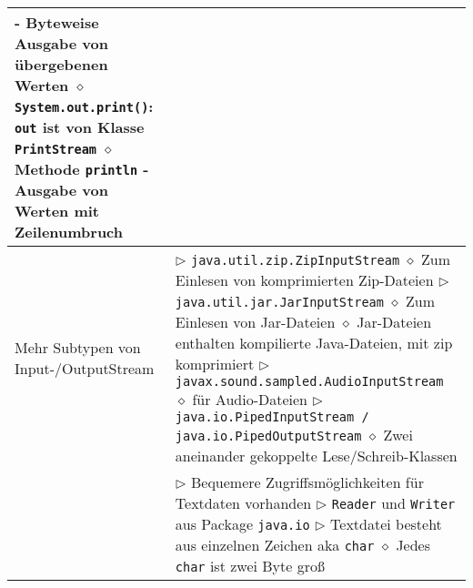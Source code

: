 \begin{longtable}{ | p{} p{} | }
{	\hspace{0.6cm} - Byteweise Ausgabe von übergebenen Werten \\
	\hspace{0.4cm} $\diamond$ \texttt{System.out.print()}: \texttt{out} ist von Klasse \texttt{PrintStream} \\
	\hspace{0.4cm} $\diamond$ Methode \texttt{println} \\
	\hspace{0.6cm} - Ausgabe von Werten mit Zeilenumbruch} \\ \hline

	\makecell[l]{Mehr Subtypen von \\Input-/OutputStream} & \makecell[l]{
	$\triangleright$ \texttt{java.util.zip.ZipInputStream} \\
	\hspace{0.4cm} $\diamond$ Zum Einlesen von komprimierten Zip-Dateien \\
	$\triangleright$ \texttt{java.util.jar.JarInputStream} \\
	\hspace{0.4cm} $\diamond$ Zum Einlesen von Jar-Dateien \\
	\hspace{0.4cm} $\diamond$ Jar-Dateien enthalten kompilierte Java-Dateien, mit zip komprimiert \\
	$\triangleright$ \texttt{javax.sound.sampled.AudioInputStream} \\
	\hspace{0.4cm} $\diamond$ für Audio-Dateien \\
	$\triangleright$ \texttt{java.io.PipedInputStream / java.io.PipedOutputStream} \\
	\hspace{0.4cm} $\diamond$ Zwei aneinander gekoppelte Lese/Schreib-Klassen
	} \\ \hline

	\makecell[l]{Textdaten direkt} & \makecell[l]{
	$\triangleright$ Bequemere Zugriffsmöglichkeiten für Textdaten vorhanden \\
	$\triangleright$ \texttt{Reader} und \texttt{Writer} aus Package \texttt{java.io} \\
	$\triangleright$ Textdatei besteht aus einzelnen Zeichen aka \texttt{char} \\
	\hspace{0.4cm} $\diamond$ Jedes \texttt{char} ist zwei Byte gro\ss} \\ \hline


\end{longtable}
